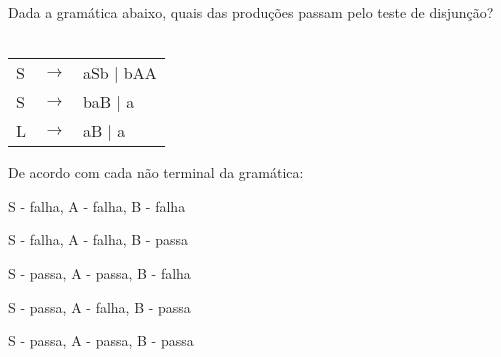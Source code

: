 \question[10]
Dada a gramática abaixo, quais das produções passam pelo teste de disjunção?\\
\\
\begin{tabular}{|l c l}
	S & $\rightarrow$ & aSb | bAA \\
    S & $\rightarrow$ & b{aB} | a \\
	L & $\rightarrow$ & aB | a \\
\end{tabular}

De acordo com cada não terminal da gramática:
\begin{choices}
\item S - falha, A - falha, B - falha
\item S - falha, A - falha, B - passa
\item S - passa, A - passa, B - falha %
\item S - passa, A - falha, B - passa
\item S - passa, A - passa, B - passa
\end{choices}
\answerline

